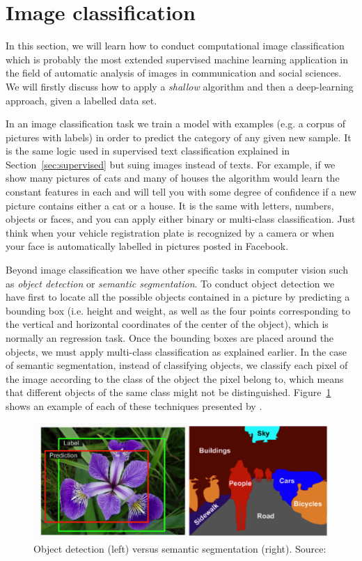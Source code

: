 \section{Image classification}
\label{sec:cnn}

In this section, we will learn how to conduct computational image classification which is probably the most extended supervised machine learning application in the field of automatic analysis of images in communication and social sciences. We will firstly discuss how to apply a \textit{shallow} algorithm and then a deep-learning approach, given a labelled data set. 	

In an image classification task we train a model with examples (e.g. a corpus of pictures with labels) in order to predict the category of any given new sample. It is the same logic used in supervised text classification  explained in Section~\ref{sec:supervised} but suing images instead of texts. For example, if we show many pictures of cats and many of houses the algorithm would learn the constant features in each and will tell you with some degree of confidence if a new picture contains either a cat or a house. It is the same with letters, numbers, objects or faces, and you can apply either binary or multi-class classification. Just think when your vehicle registration plate is recognized by a camera or when your face is automatically labelled in pictures posted in Facebook.

Beyond image classification we have other specific tasks in computer vision such as \textit{object detection} or \textit{semantic segmentation}. To conduct object detection we have first to locate all the possible objects contained in a picture by predicting a bounding box (i.e. height and weight, as well as the four points corresponding to the vertical and horizontal coordinates of the center of the object), which is normally an regression task. Once the bounding boxes are placed around the objects, we must apply multi-class classification as explained earlier. In the case of semantic segmentation, instead of classifying objects, we classify each pixel of the image according to the class of the object the pixel belong to, which means that different objects of the same class might not be distinguished. Figure~\ref{fig:location} shows an example of each of these techniques presented by \citet{geron2019hands}.

\begin{figure}
\centering
\includegraphics[width=0.9\linewidth]{figures/ch15_location.png}
\caption{Object detection (left) versus semantic segmentation (right).
Source: \citet{geron2019hands}}
\label{fig:location}
\end{figure}


